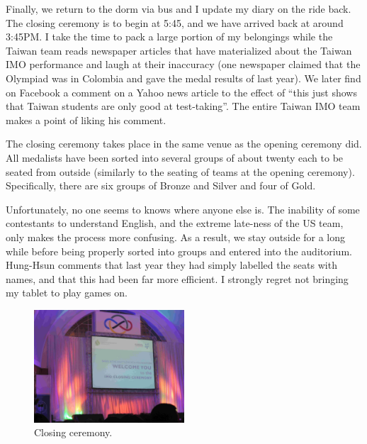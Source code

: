 \documentclass[11pt]{scrreprt}
\numberwithin{figure}{chapter}
\begin{document}
Finally, we return to the dorm via bus and I update my diary on the ride back.
The closing ceremony is to begin at 5:45, and we have arrived back at around 3:45PM.
I take the time to pack a large portion of my belongings while the Taiwan team
reads newspaper articles that have materialized about the Taiwan IMO performance and laugh at their inaccuracy
(one newspaper claimed that the Olympiad was in Colombia and gave the medal results of last year).
We later find on Facebook a comment on a Yahoo news article to the effect of ``this just shows that
Taiwan students are only good at test-taking''. The entire Taiwan IMO team makes a point of liking his comment.

The closing ceremony takes place in the same venue as the opening ceremony did.
All medalists have been sorted into several groups of about twenty each to be seated from outside
(similarly to the seating of teams at the opening ceremony).
Specifically, there are six groups of Bronze and Silver and four of Gold.

Unfortunately, no one seems to knows where anyone else is.
The inability of some contestants to understand English, and the extreme late-ness of the US team, only makes the process more confusing.
As a result, we stay outside for a long while before being properly sorted into groups and entered into the auditorium.
Hung-Hsun comments that last year they had simply labelled the seats with names, and that this had been far more efficient.
I strongly regret not bringing my tablet to play games on.

\begin{figure}[ht]
  \centering
  \includegraphics[width=0.5\textwidth]{media/closing.jpg}
  \caption{Closing ceremony.}
\end{figure}
\end{document}
